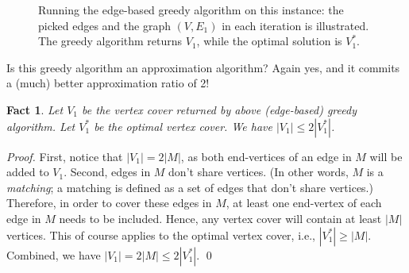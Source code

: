 \documentclass[letterpaper,11pt]{article}
\theoremstyle{mytheorem}
\newtheorem{fact}{Fact}
\begin{document}

\begin{figure}[h]
\centering{}
\caption{Running the edge-based greedy algorithm on this instance:
the picked edges and the graph $(V, E_1)$ in each iteration is illustrated. 
The greedy algorithm returns $V_1$, while the optimal solution is $V_1^*$.}
\label{fig:greedy2}
\end{figure}

Is this greedy algorithm an approximation algorithm? Again yes, and it commits
a (much) better approximation ratio of 2!
\begin{fact}
Let $V_1$ be the vertex cover returned by above (edge-based) greedy algorithm.
Let $V_1^*$ be the optimal vertex cover.
We have $|V_1| \le 2 |V_1^*|$.
\end{fact}
\emph{Proof.} First, notice that $|V_1| = 2|M|$, as both end-vertices
of an edge in $M$ will be added to $V_1$. Second, edges in $M$ don't
share vertices. (In other words, $M$ is a \emph{matching}; a matching
is defined as a set of edges that don't share vertices.)
Therefore, in order to cover these edges in $M$, at least
one end-vertex of each edge in $M$ needs to be included.
Hence, any vertex cover will contain at least $|M|$ vertices.
This of course applies to the optimal vertex cover, i.e., $|V_1^*| \ge |M|$.
Combined, we have $|V_1| = 2|M| \le 2|V_1^*|$.  \qed
\end{document}
